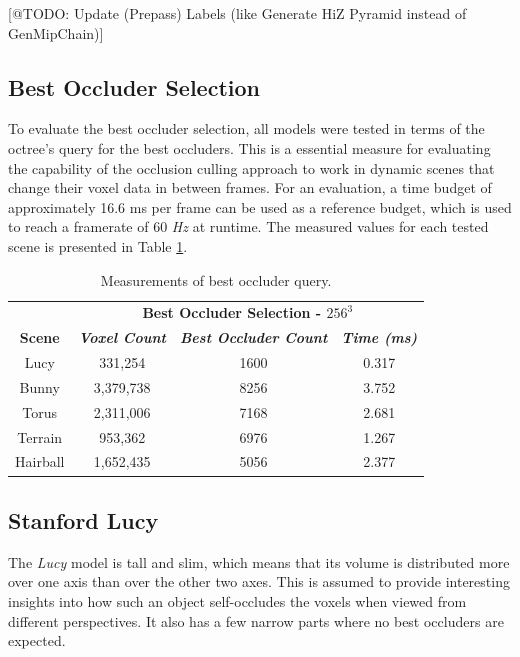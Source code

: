 [@TODO: Update (Prepass) Labels (like Generate HiZ Pyramid instead of GenMipChain)]

\subsection*{Best Occluder Selection}

To evaluate the best occluder selection, all models were tested in terms of the octree's 
query for the best occluders. This is a essential measure for evaluating the capability 
of the occlusion culling approach to work in dynamic scenes that change their voxel 
data in between frames. For an evaluation, a time budget of approximately 16.6 ms per 
frame can be used as a reference budget, which is used to reach a framerate of 60 \emph{Hz} 
at runtime. The measured values for each tested scene is presented in Table \ref{tab:best-occluder-query}. 

\begin{table}[htbp]
  \begin{center}
    \begin{tabular}{|c|c|c|c|}
      \hline
      \textbf{}&\multicolumn{3}{|c|}{\textbf{Best Occluder Selection - $256^3$}} \\
      \cline{2-4} 
      \textbf{Scene} & \textbf{\textit{Voxel Count}}& \textbf{\textit{Best Occluder Count}}& \textbf{\textit{Time (ms)}} \\
      \hline
      Lucy        & 331,254   & 1600 & 0.317 \\
      Bunny       & 3,379,738 & 8256 & 3.752 \\
      Torus       & 2,311,006 & 7168 & 2.681 \\
      Terrain     & 953,362   & 6976 & 1.267 \\
      Hairball    & 1,652,435 & 5056 & 2.377 \\
      \hline
    \end{tabular}
    \caption{Measurements of best occluder query.}
  \label{tab:best-occluder-query}
  \end{center}
\end{table}


\subsection*{Stanford Lucy}

The \emph{Lucy} model is tall and slim, which means that its volume is distributed more over one axis 
than over the other two axes. This is assumed to provide interesting insights into how such an object 
self-occludes the voxels when viewed from different perspectives. It also has a few narrow parts where 
no best occluders are expected.


